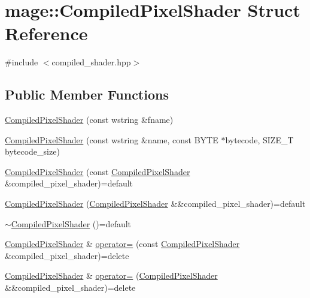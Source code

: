 \hypertarget{structmage_1_1_compiled_pixel_shader}{}\section{mage\+:\+:Compiled\+Pixel\+Shader Struct Reference}
\label{structmage_1_1_compiled_pixel_shader}


{\ttfamily \#include $<$compiled\+\_\+shader.\+hpp$>$}

\subsection*{Public Member Functions}
\begin{DoxyCompactItemize}
\item 
\hyperlink{structmage_1_1_compiled_pixel_shader_a1c8cc509e405a53456dff36c204ec353}{Compiled\+Pixel\+Shader} (const wstring \&fname)
\item 
\hyperlink{structmage_1_1_compiled_pixel_shader_abedab6ae2f5acbb5054e78abe40709e9}{Compiled\+Pixel\+Shader} (const wstring \&name, const B\+Y\+TE $\ast$bytecode, S\+I\+Z\+E\+\_\+T bytecode\+\_\+size)
\item 
\hyperlink{structmage_1_1_compiled_pixel_shader_a5d749d97595bc9569dfd73d3411be4b5}{Compiled\+Pixel\+Shader} (const \hyperlink{structmage_1_1_compiled_pixel_shader}{Compiled\+Pixel\+Shader} \&compiled\+\_\+pixel\+\_\+shader)=default
\item 
\hyperlink{structmage_1_1_compiled_pixel_shader_a472407078fe751a18d8c2ffe6e6bbef5}{Compiled\+Pixel\+Shader} (\hyperlink{structmage_1_1_compiled_pixel_shader}{Compiled\+Pixel\+Shader} \&\&compiled\+\_\+pixel\+\_\+shader)=default
\item 
\hyperlink{structmage_1_1_compiled_pixel_shader_aa108e83f2afcc6ade97f3dbaa526dee1}{$\sim$\+Compiled\+Pixel\+Shader} ()=default
\item 
\hyperlink{structmage_1_1_compiled_pixel_shader}{Compiled\+Pixel\+Shader} \& \hyperlink{structmage_1_1_compiled_pixel_shader_a0dde38701c2e15a52d5d80f992a32551}{operator=} (const \hyperlink{structmage_1_1_compiled_pixel_shader}{Compiled\+Pixel\+Shader} \&compiled\+\_\+pixel\+\_\+shader)=delete
\item 
\hyperlink{structmage_1_1_compiled_pixel_shader}{Compiled\+Pixel\+Shader} \& \hyperlink{structmage_1_1_compiled_pixel_shader_a347557ae3d91dd0d561c56bc2c811a2f}{operator=} (\hyperlink{structmage_1_1_compiled_pixel_shader}{Compiled\+Pixel\+Shader} \&\&compiled\+\_\+pixel\+\_\+shader)=delete
\end{DoxyCompactItemize}
